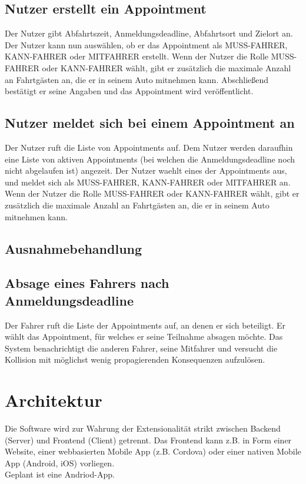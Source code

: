 \documentclass[11pt,a4paper]{article}
\begin{document}
\subsection*{Nutzer erstellt ein Appointment}
Der Nutzer gibt Abfahrtszeit, Anmeldungsdeadline, Abfahrtsort und Zielort an. Der Nutzer kann nun auswählen, ob er das Appointment als MUSS-FAHRER, KANN-FAHRER oder MITFAHRER erstellt. Wenn der Nutzer die Rolle MUSS-FAHRER oder KANN-FAHRER wählt, gibt er zusätzlich die maximale Anzahl an Fahrtgästen an, die er in seinem Auto mitnehmen kann. Abschließend bestätigt er seine Angaben und das Appointment wird veröffentlicht.

\subsection*{Nutzer meldet sich bei einem Appointment an}
Der Nutzer ruft die Liste von Appointments auf. Dem Nutzer werden daraufhin eine Liste von aktiven Appointments (bei welchen die Anmeldungsdeadline noch nicht abgelaufen ist) angezeit. Der Nutzer waehlt eines der Appointments aus, und meldet sich als MUSS-FAHRER, KANN-FAHRER oder MITFAHRER an. Wenn der Nutzer die Rolle MUSS-FAHRER oder KANN-FAHRER wählt, gibt er zusätzlich die maximale Anzahl an Fahrtgästen an, die er in seinem Auto mitnehmen kann.

\subsection{Ausnahmebehandlung}
\subsection*{Absage eines Fahrers nach Anmeldungsdeadline}
Der Fahrer ruft die Liste der Appointments auf, an denen er sich beteiligt. Er wählt das Appointment, für welches er seine Teilnahme absagen möchte. Das System benachrichtigt die anderen Fahrer, seine Mitfahrer und versucht die Kollision mit möglichst wenig propagierenden Konsequenzen aufzulösen.

\section{Architektur}
Die Software wird zur Wahrung der Extensionalität strikt zwischen Backend (Server) und Frontend (Client) getrennt. Das Frontend kann z.B. in Form einer Website, einer webbasierten Mobile App (z.B. Cordova) oder einer nativen Mobile App (Android, iOS) vorliegen.
\bigskip\\
Geplant ist eine Andriod-App.
\end{document}
